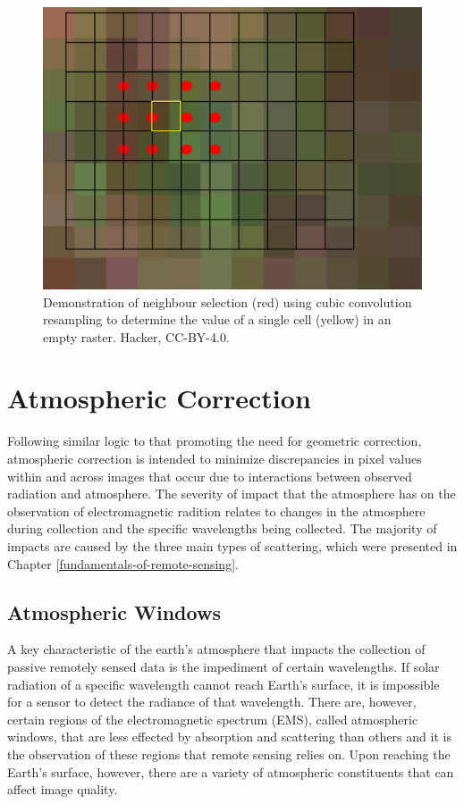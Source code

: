 \documentclass[
]{book}
\begin{document}
\begin{figure}
\includegraphics[width=0.75\linewidth,height=0.75\textheight]{images/13-cubic_convolution} \caption{Demonstration of neighbour selection (red) using cubic convolution resampling to determine the value of a single cell (yellow) in an empty raster. Hacker, CC-BY-4.0.}\label{fig:13-cubic}
\end{figure}

\hypertarget{atmospheric-correction}{%
\section{Atmospheric Correction}\label{atmospheric-correction}}

Following similar logic to that promoting the need for geometric correction, atmospheric correction is intended to minimize discrepancies in pixel values within and across images that occur due to interactions between observed radiation and atmosphere. The severity of impact that the atmosphere has on the observation of electromagnetic radition relates to changes in the atmosphere during collection and the specific wavelengths being collected. The majority of impacts are caused by the three main types of scattering, which were presented in Chapter \ref{fundamentals-of-remote-sensing}.

\hypertarget{atmospheric-windows}{%
\subsection{Atmospheric Windows}\label{atmospheric-windows}}

A key characteristic of the earth's atmosphere that impacts the collection of passive remotely sensed data is the impediment of certain wavelengths. If solar radiation of a specific wavelength cannot reach Earth's surface, it is impossible for a sensor to detect the radiance of that wavelength. There are, however, certain regions of the electromagnetic spectrum (EMS), called atmospheric windows, that are less effected by absorption and scattering than others and it is the observation of these regions that remote sensing relies on. Upon reaching the Earth's surface, however, there are a variety of atmospheric constituents that can affect image quality.
\end{document}
